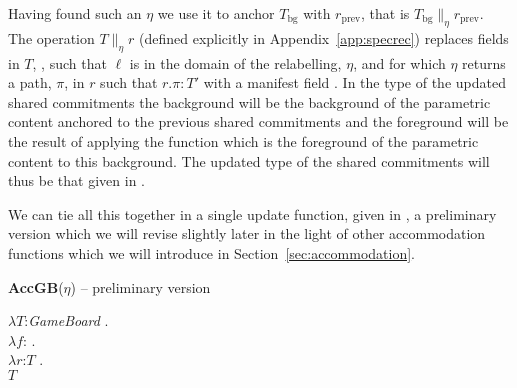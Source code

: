 Having found such an $\eta$ we use it to anchor
$T_{\mathrm{bg}}$ with $r_{\mathrm{prev}}$, that is
$T_{\mathrm{bg}}\parallel_\eta r_{\mathrm{prev}}$. The operation
$T \parallel_\eta r$ (defined explicitly in
Appendix~\ref{app:specrec}) replaces fields in $T$, , such
that $\ell$ is in the
domain of the relabelling, $\eta$, and for which $\eta$ returns a
path, $\pi$,
in $r$ such that $r.\pi:T'$ with a manifest
field . In the type of the updated shared
commitments the background will be the background of the parametric
content anchored to the previous shared commitments and the foreground
will be the result of applying the function which is the foreground of
the parametric content to this background.
The updated type of the shared commitments
will thus be that given in \nexteg{}.   
\begin{ex} 
\end{ex} 
We can tie all this together in a single update function, given in
\nexteg{}, a preliminary version which we will revise slightly later
in the light of other accommodation functions which we will introduce
in Section~\ref{sec:accommodation}.
\begin{ex} 
\textbf{AccGB}($\eta$) -- preliminary version

$\lambda T$:\textit{GameBoard} . \\
\hspace*{1em} $\lambda
f$:
              . \\
\hspace*{2em} $\lambda r$:$T$ . \\ 
\hspace*{3em} $T$ \fbox{\d{$\wedge$}} 
\label{ex:AccGBprelim} 
\end{ex} 
